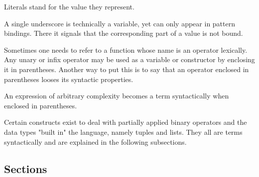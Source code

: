 

Literals stand for the value they represent.

A single underscore is technically a variable, yet can only appear in pattern bindings. There it signals that the corresponding part of a value is not bound.

Sometimes one needs to refer to a function whose name is an operator lexically. Any unary or infix operator may be used as a variable or constructor by enclosing it in parentheses.
Another way to put this is to say that an operator enclosed in parentheses looses its syntactic properties.


An expression of arbitrary complexity becomes a term syntactically when enclosed in parentheses.

Certain constructs exist to deal with partially applied binary operators and the data types "built in" the language, namely tuples and lists. They all are terms syntactically and are explained in the following subsections.

\subsection{Sections} 

\begin{flushleft}
 \sym{(}   \sym{)}
 \alt{} \sym{(}   \sym{)}
\end{flushleft}

